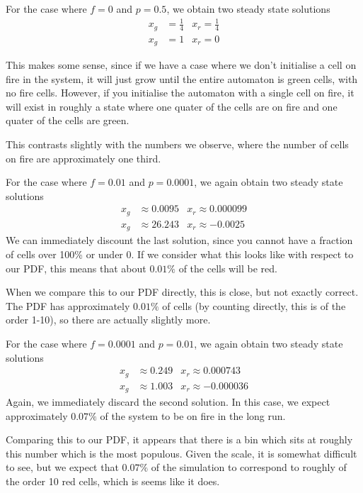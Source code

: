 \documentclass[11pt,a4paper]{article}
\begin{document}
\par For the case where $f= 0 $ and $p = 0.5$, we obtain two steady state solutions 
\begin{align}
x_g &= \frac{1}{4} & x_r = \frac{1}{4}  \\
x_g &= 1 & x_r = 0 \label{eq:case_1:ss}
\end{align}

This makes some sense, since if we have a case where we don't initialise a cell on fire in the system, it will just grow until the entire automaton is green cells, with no fire cells. 
However, if you initialise the automaton with a single cell on fire, it will exist in roughly a state where one quater of the cells are on fire and one quater of the cells are green. 
\par This contrasts slightly with the numbers we observe, where the number of cells on fire are approximately one third.

\par For the case where $f = 0.01$ and $p = 0.0001$, we again obtain two steady state solutions 
\begin{align}
x_g &\approx 0.0095     &x_r\approx 0.000099 \label{eq:case_2} \\
x_g &\approx 26.243    &x_r\approx -0.0025  
\end{align}
We can immediately discount the last solution, since you cannot have a fraction of cells over 100\% or under 0. If we consider what this looks like with respect to our PDF, this means that about $0.01\%$ of the cells will be red. 
\par When we compare this to our PDF directly, this is close, but not exactly correct. The PDF has approximately $0.01\%$ of cells (by counting directly, this is of the order 1-10), so there are actually slightly more.

\par For the case where $f = 0.0001$ and $p = 0.01$, we again obtain two steady state solutions 
\begin{align}
x_g &\approx 0.249 & x_r \approx 0.000743\\
x_g &\approx 1.003 & x_r \approx -0.000036
\end{align}
Again, we immediately discard the second solution. In this case, we expect approximately $0.07 \% $ of the system to be on fire in the long run. 

\par Comparing this to our PDF, it appears that there is a bin which sits at roughly this number which is the most populous. Given the scale, it is somewhat difficult to see, but we expect that $0.07\%$ of the simulation to correspond to roughly of the order 10 red cells, which is seems like it does. 
\end{document}
